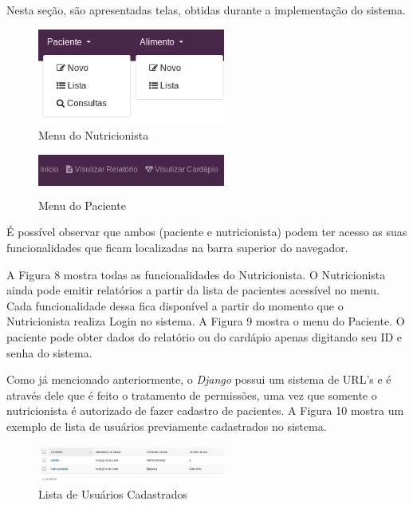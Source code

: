 \documentclass[
	12pt,				%
    oneside,			%
	a4paper,			%
	english,			%
	french,				%
	spanish,			%
	brazil,				%
	]{abntex2}
\begin{document}
Nesta seção, são apresentadas telas, obtidas durante a implementação do sistema.

\begin{figure} [hbt] 
\label{menuNut} 
\caption{Menu do Nutricionista}
\begin{center}
\includegraphics[width=0.55\textwidth]{menuNut1.png}
\end{center}
\end{figure}

\begin{figure} [hbt] 
\label{menuPac} 
\caption{Menu do Paciente}
\begin{center}
\includegraphics[width=0.55\textwidth]{menuPac1.png}
\end{center}
\end{figure}

É possível observar que ambos (paciente e nutricionista) podem ter acesso as suas funcionalidades que ficam localizadas
na barra superior do navegador.

A Figura 8 mostra todas as funcionalidades do Nutricionista. O Nutricionista
ainda pode emitir relatórios a partir da lista de pacientes acessível no menu. Cada
funcionalidade dessa fica disponível a partir do momento que o Nutricionista realiza 
Login no sistema. A Figura 9 mostra o menu do Paciente. O paciente pode obter dados
do relatório ou do cardápio apenas digitando seu ID e senha do sistema.

Como já mencionado anteriormente, o \textit{Django} possui um sistema de URL's e é através dele que
é feito o tratamento de permissões, uma vez que somente o nutricionista é autorizado de fazer cadastro
de pacientes. A Figura 10 mostra um exemplo de lista de usuários previamente cadastrados no sistema.

\begin{figure} [hbt]
\label{listUser} 
\caption{Lista de Usuários Cadastrados}
\begin{center}
\includegraphics[width=0.55\textwidth]{listaUsuarios.png}
\end{center}
\end{figure}
\end{document}
